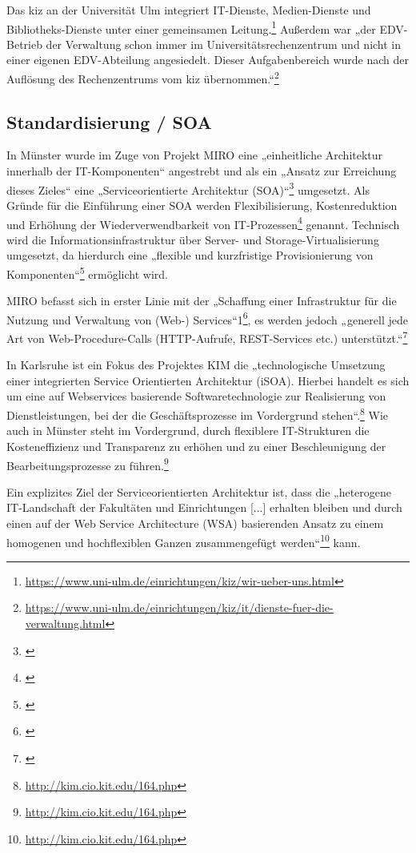 Das kiz an der Universität Ulm integriert IT-Dienste, Medien-Dienste und Bibliotheks-Dienste unter einer gemeinsamen Leitung.\footnote{\url{https://www.uni-ulm.de/einrichtungen/kiz/wir-ueber-uns.html}} Außerdem war „der EDV-Betrieb der Verwaltung schon immer im Universitätsrechenzentrum und nicht in einer eigenen EDV-Abteilung angesiedelt. Dieser Aufgabenbereich wurde nach der Auflösung des Rechenzentrums vom kiz übernommen.“\footnote{\url{https://www.uni-ulm.de/einrichtungen/kiz/it/dienste-fuer-die-verwaltung.html}}

\subsection{Standardisierung / SOA}
In Münster wurde im Zuge von Projekt MIRO eine „einheitliche Architektur innerhalb der IT-Komponenten“ angestrebt und als ein „Ansatz zur Erreichung dieses Zieles“ eine „Serviceorientierte Architektur (SOA)“\footnote{\cite[51]{bode_informationsmanagement_2010}} umgesetzt. Als Gründe für die Einführung einer SOA werden Flexibilisierung, Kostenreduktion und Erhöhung der Wiederverwendbarkeit von IT-Prozessen\footnote{\cite[51]{bode_informationsmanagement_2010}} genannt. Technisch wird die Informationsinfrastruktur über Server- und Storage-Virtualisierung umgesetzt, da hierdurch eine „flexible und kurzfristige Provisionierung von Komponenten“\footnote{\cite[52]{bode_informationsmanagement_2010}} ermöglicht wird.

MIRO befasst sich in erster Linie mit der „Schaffung einer Infrastruktur für die Nutzung und Verwaltung von (Web-) Services“1\footnote{\cite[52]{bode_informationsmanagement_2010}}, es werden jedoch „generell jede Art von Web-Procedure-Calls (HTTP-Aufrufe, REST-Services etc.) unterstützt.“\footnote{\cite[52]{bode_informationsmanagement_2010}}

In Karlsruhe ist ein Fokus des Projektes KIM die „technologische Umsetzung einer integrierten Service Orientierten Architektur (iSOA). Hierbei handelt es sich um eine auf Webservices basierende Softwaretechnologie zur Realisierung von Dienstleistungen, bei der die Geschäftsprozesse im Vordergrund stehen“.\footnote{\url{http://kim.cio.kit.edu/164.php}}
Wie auch in Münster steht im Vordergrund, durch flexiblere IT-Strukturen die Kosteneffizienz und Transparenz zu erhöhen und zu einer Beschleunigung der Bearbeitungsprozesse zu führen.\footnote{\url{http://kim.cio.kit.edu/164.php}}

Ein explizites Ziel der Serviceorientierten Architektur ist, dass die „heterogene IT-Landschaft der Fakultäten und Einrichtungen [...] erhalten bleiben und durch einen auf der Web Service Architecture (WSA) basierenden Ansatz zu einem homogenen und hochflexiblen Ganzen zusammengefügt werden“\footnote{\url{http://kim.cio.kit.edu/164.php}} kann.

